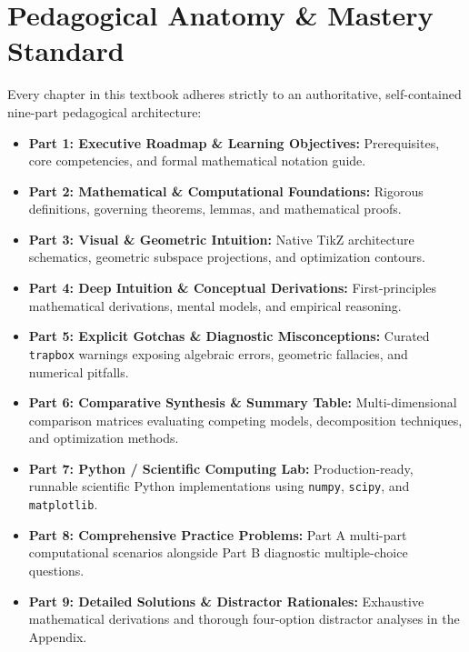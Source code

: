 \documentclass[11pt,a4paper,oneside]{book}
\begin{document}
\section*{Pedagogical Anatomy \& Mastery Standard}
Every chapter in this textbook adheres strictly to an authoritative, self-contained nine-part pedagogical architecture:
\begin{itemize}
    \item \textcolor{primarydark}{\textbf{Part 1: Executive Roadmap \& Learning Objectives:}} Prerequisites, core competencies, and formal mathematical notation guide.
    \item \textcolor{tealdef}{\textbf{Part 2: Mathematical \& Computational Foundations:}} Rigorous definitions, governing theorems, lemmas, and mathematical proofs.
    \item \textcolor{primarydark}{\textbf{Part 3: Visual \& Geometric Intuition:}} Native TikZ architecture schematics, geometric subspace projections, and optimization contours.
    \item \textcolor{purpleex}{\textbf{Part 4: Deep Intuition \& Conceptual Derivations:}} First-principles mathematical derivations, mental models, and empirical reasoning.
    \item \textcolor{amberwarning}{\textbf{Part 5: Explicit Gotchas \& Diagnostic Misconceptions:}} Curated \texttt{trapbox} warnings exposing algebraic errors, geometric fallacies, and numerical pitfalls.
    \item \textcolor{tealdef}{\textbf{Part 6: Comparative Synthesis \& Summary Table:}} Multi-dimensional comparison matrices evaluating competing models, decomposition techniques, and optimization methods.
    \item \textcolor{primarydark}{\textbf{Part 7: Python / Scientific Computing Lab:}} Production-ready, runnable scientific Python implementations using \texttt{numpy}, \texttt{scipy}, and \texttt{matplotlib}.
    \item \textcolor{purpleex}{\textbf{Part 8: Comprehensive Practice Problems:}} Part A multi-part computational scenarios alongside Part B diagnostic multiple-choice questions.
    \item \textcolor{coralformula}{\textbf{Part 9: Detailed Solutions \& Distractor Rationales:}} Exhaustive mathematical derivations and thorough four-option distractor analyses in the Appendix.
\end{itemize}



\mainmatter














\backmatter


\printindex
\end{document}
